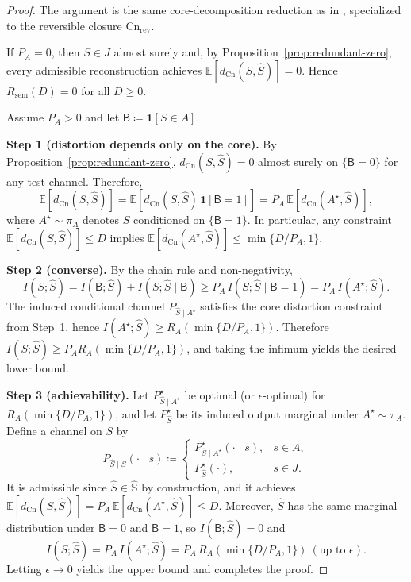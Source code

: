 \documentclass[twoside]{article}
\newcommand{\Cn}{\mathrm{Cn}}
\newcommand{\sem}{\mathrm{sem}}
\newcommand{\E}{\mathbb{E}}
\newcommand{\1}{\mathbf{1}}
\begin{document}
\begin{proof}
The argument is the same core-decomposition reduction as in \cite{xu2026rate}, specialized to the reversible closure \(\Cn_{\mathrm{rev}}\).

If \(P_A=0\), then \(S\in J\) almost surely and, by Proposition~\ref{prop:redundant-zero}, every admissible reconstruction achieves
\(\E[d_{\Cn}(S,\hat S)]=0\). Hence \(R_{\sem}(D)=0\) for all \(D\ge 0\).

Assume \(P_A>0\) and let \(\mathsf{B}\coloneqq \1[S\in A]\).

\medskip
\noindent\textbf{Step 1 (distortion depends only on the core).}
By Proposition~\ref{prop:redundant-zero}, \(d_{\Cn}(S,\hat S)=0\) almost surely on \(\{\mathsf{B}=0\}\) for any test channel.
Therefore,
\[
\E[d_{\Cn}(S,\hat S)]
= \E[d_{\Cn}(S,\hat S)\,\mathbf{1}[\mathsf{B}=1]]
= P_A\,\E[d_{\Cn}(A^\star,\hat S)],
\]
where \(A^\star\sim\pi_A\) denotes \(S\) conditioned on \(\{\mathsf{B}=1\}\).
In particular, any constraint \(\E[d_{\Cn}(S,\hat S)]\le D\) implies
\(\E[d_{\Cn}(A^\star,\hat S)]\le \min\{D/P_A,1\}\).

\medskip
\noindent\textbf{Step 2 (converse).}
By the chain rule and non-negativity,
\[
I(S;\hat S)=I(\mathsf{B};\hat S)+I(S;\hat S\mid \mathsf{B})
\ge P_A\,I(S;\hat S\mid \mathsf{B}=1)
= P_A\,I(A^\star;\hat S).
\]
The induced conditional channel \(P_{\hat S\mid A^\star}\) satisfies the core distortion constraint from Step~1,
hence \(I(A^\star;\hat S) \ge R_A(\min\{D/P_A,1\})\). Therefore
\(I(S;\hat S)\ge P_A R_A(\min\{D/P_A,1\})\), and taking the infimum yields the desired lower bound.

\medskip
\noindent\textbf{Step 3 (achievability).}
Let \(P^{\star}_{\hat S\mid A^\star}\) be optimal (or \(\epsilon\)-optimal) for \(R_A(\min\{D/P_A,1\})\),
and let \(P^{\star}_{\hat S}\) be its induced output marginal under \(A^\star\sim\pi_A\).
Define a channel on \(S\) by
\[
P_{\hat S\mid S}(\cdot\mid s)\coloneqq
\begin{cases}
P^{\star}_{\hat S\mid A^\star}(\cdot\mid s), & s\in A,\\
P^{\star}_{\hat S}(\cdot), & s\in J.
\end{cases}
\]
It is admissible since \(\hat S\in\hat{\mathbb{S}}\) by construction, and it achieves
\(\E[d_{\Cn}(S,\hat S)]=P_A\,\E[d_{\Cn}(A^\star,\hat S)]\le D\).
Moreover, \(\hat S\) has the same marginal distribution under \(\mathsf{B}=0\) and \(\mathsf{B}=1\), so \(I(\mathsf{B};\hat S)=0\) and
\[
I(S;\hat S)=P_A\,I(A^\star;\hat S)=P_A\,R_A(\min\{D/P_A,1\}) \ (\text{up to }\epsilon).
\]
Letting \(\epsilon\to 0\) yields the upper bound and completes the proof.
\end{proof}
\end{document}
